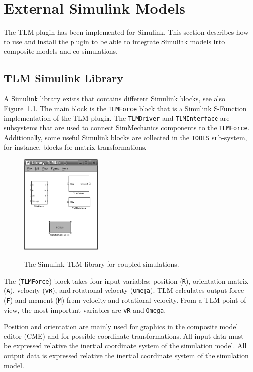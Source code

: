 \chapter{External Simulink Models}
\label{MMSimulink}
The TLM plugin has been implemented for Simulink. 
This section describes how to use and install the plugin to be able to integrate Simulink models into composite models and co-simulations.

\section{TLM Simulink Library}
\label{sec:TLMLib}
A Simulink library exists that contains different Simulink blocks, see also Figure~\ref{fig:TLMLib}. 
The main block is the {\tt TLMForce} block that is a Simulink S-Function implementation of the TLM plugin. 
The {\tt TLMDriver} and {\tt TLMInterface} are subsystems that are used to connect SimMechanics components to the {\tt TLMForce}. 
Additionally, some useful Simulink blocks are collected in the {\tt TOOLS} sub-system, for instance, blocks for matrix transformations.

\begin{figure}[ht]\begin{center}
   {\includegraphics[width=4cm]{figs/TLMLib.png}}
    \caption{The Simulink TLM library for coupled simulations.}
    \label{fig:TLMLib}
\end{center}\end{figure}

The ({\tt TLMForce}) block takes four input variables: position ({\tt R}), orientation matrix ({\tt A}), velocity ({\tt vR}), and rotational velocity ({\tt Omega}). 
TLM calculates output force ({\tt F}) and moment ({\tt M}) from velocity and rotational velocity. 
From a TLM point of view, the most important variables are {\tt vR} and {\tt Omega}. 

Position and orientation are mainly used for graphics in the composite model editor (CME) and for possible coordinate transformations. 
All input data must be expressed relative the inertial coordinate system of the simulation model. 
All output data is expressed relative the inertial coordinate system of the simulation model.

